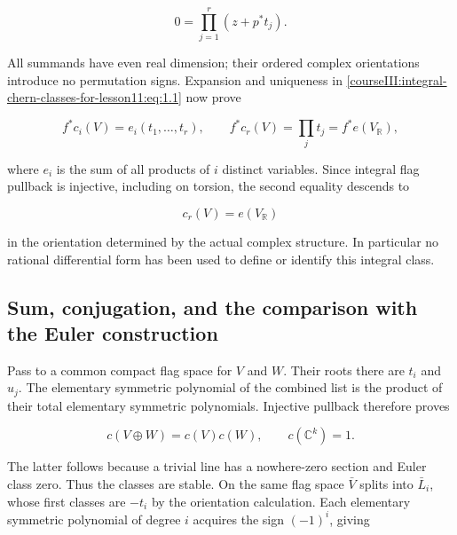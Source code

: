 \begin{equation}
0=\prod_{j=1}^r(z+p^*t_j).
\label{courseIII:integral-chern-classes-for-lesson11:eq:1.2}
\end{equation}

All summands have even real dimension; their ordered complex orientations introduce no permutation signs. Expansion and uniqueness in \eqref{courseIII:integral-chern-classes-for-lesson11:eq:1.1} now prove

\begin{equation}
f^*c_i(V)=e_i(t_1,\ldots,t_r),\qquad
f^*c_r(V)=\prod_jt_j=f^*e(V_{\mathbb R}),
\label{courseIII:integral-chern-classes-for-lesson11:eq:1.3}
\end{equation}

where \(e_i\) is the sum of all products of \(i\) distinct variables. Since integral flag pullback is injective, including on torsion, the second equality descends to

\begin{equation}
c_r(V)=e(V_{\mathbb R})
\label{courseIII:integral-chern-classes-for-lesson11:eq:1.4}
\end{equation}

in the orientation determined by the actual complex structure. In particular no rational differential form has been used to define or identify this integral class.

\subsection{Sum, conjugation, and the comparison with the Euler construction}
\label{courseIII:integral-chern-classes-for-lesson11:chern-rules}

\label{courseIII:integral-chern-classes-for-lesson11:section-2}\label{courseIII:integral-chern-classes-for-lesson11:CG-S6-CHERN-2}

Pass to a common compact flag space for \(V\) and \(W\). Their roots there are \(t_i\) and \(u_j\). The elementary symmetric polynomial of the combined list is the product of their total elementary symmetric polynomials. Injective pullback therefore proves

\begin{equation}
c(V\oplus W)=c(V)c(W),\qquad c(\mathbb C^k)=1.
\label{courseIII:integral-chern-classes-for-lesson11:eq:2.1}
\end{equation}

The latter follows because a trivial line has a nowhere-zero section and Euler class zero. Thus the classes are stable. On the same flag space \(\bar V\) splits into \(\bar L_i\), whose first classes are \(-t_i\) by the orientation calculation. Each elementary symmetric polynomial of degree \(i\) acquires the sign \((-1)^i\), giving


